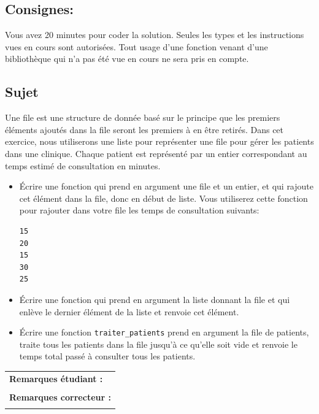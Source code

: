 \documentclass[a4paper,11pt]{article}
\begin{document}
\subsection*{Consignes:} Vous avez 20 minutes pour coder la solution. Seules les types et les instructions vues en cours sont autorisées. Tout usage d'une fonction 
venant d'une bibliothèque qui n'a pas été vue en cours ne sera pris en compte. 


\subsection*{Sujet}

Une file est une structure de donnée basé sur le principe que les premiers éléments ajoutés dans la file seront les premiers à en être retirés.
Dans cet exercice, nous utiliserons une liste pour représenter une file pour gérer les patients dans une clinique. Chaque patient est représenté par un entier correspondant au temps estimé de consultation en minutes.

\begin{itemize}
\item[1.] Écrire une fonction qui prend en argument une file et un entier, et qui rajoute cet élément dans la file, donc en début de liste. 
Vous utiliserez cette fonction pour rajouter dans votre file les temps de consultation suivants:
\begin{verbatim}
15
20
15
30
25
\end{verbatim}
\item[2.]  Écrire une fonction qui prend en argument la liste donnant la file et qui enlève le dernier élément de la liste et renvoie cet élément. 
\item[3.]  Écrire une fonction \texttt{traiter\_patients} prend en argument  la file de patients, traite tous les patients dans la file jusqu’à ce qu’elle soit vide et 
renvoie le temps total passé à consulter tous les patients.
\end{itemize}



\vspace*{-0.2 cm}
\begin{table}[h!]
\centering
\renewcommand{\arraystretch}{1.4} %
\begin{tabular}{|p{15cm}|}
\hline
\textbf{Remarques étudiant :}    \\
 \\
\hline
\textbf{Remarques correcteur :}  \\
 \\
\hline
\end{tabular}
\end{table}
\end{document}
